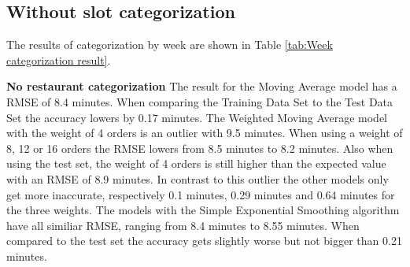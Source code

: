 \subsection{Without slot categorization}
The results of categorization by week are shown in Table \ref{tab:Week categorization result}.
\begin{table}[h]
\centering
\caption{Week categorization without slots}
\label{tab:Week categorization result}
\end{table}
\newline\newline\textbf{No restaurant categorization}\newline
The result for the Moving Average model has a RMSE of 8.4 minutes. When comparing the Training Data Set to the Test Data Set the accuracy lowers by 0.17 minutes. The Weighted Moving Average model with the weight of 4 orders is an outlier with 9.5 minutes. When using a weight of 8, 12 or 16 orders the RMSE lowers from 8.5 minutes to 8.2 minutes. Also when using the test set, the weight of 4 orders is still higher than the expected value with an RMSE of 8.9 minutes. In contrast to this outlier the other models only get more inaccurate, respectively 0.1 minutes, 0.29 minutes and 0.64 minutes for the three weights. The models with the Simple Exponential Smoothing algorithm have all similiar RMSE, ranging from 8.4 minutes to 8.55 minutes. When compared to the test set the accuracy gets slightly worse but not bigger than 0.21 minutes.\newline
